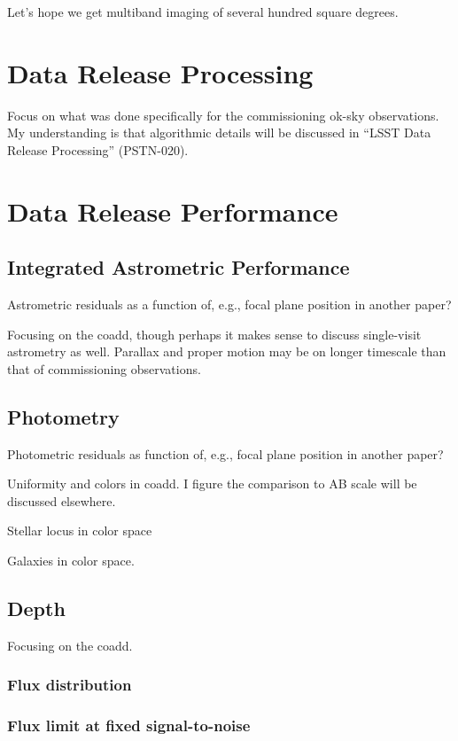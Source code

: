 Let's hope we get multiband imaging of several hundred square degrees.

\section{Data Release Processing}

Focus on what was done specifically for the commissioning ok-sky observations.
My understanding is that algorithmic details will be discussed in ``LSST Data Release Processing'' (PSTN-020).

\section{Data Release Performance}

\subsection{Integrated Astrometric Performance}

Astrometric residuals as a function of, e.g., focal plane position in another paper?

Focusing on the coadd, though perhaps it makes sense to discuss single-visit astrometry as well.
Parallax and proper motion may be on longer timescale than that of commissioning observations.

\subsection{Photometry}

Photometric residuals as function of, e.g., focal plane position in another paper?

Uniformity and colors in coadd.
I figure the comparison to AB scale will be discussed elsewhere.

Stellar locus in color space

Galaxies in color space.

\subsection{Depth}

Focusing on the coadd.

\subsubsection{Flux distribution}

\subsubsection{Flux limit at fixed signal-to-noise}

